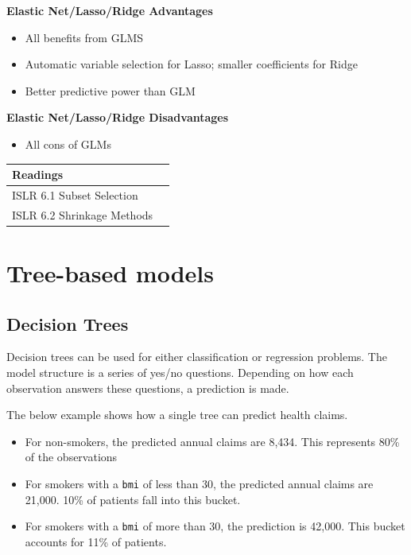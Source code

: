 \documentclass[]{book}
\providecommand{\tightlist}{%
  \setlength{\itemsep}{0pt}\setlength{\parskip}{0pt}}
\begin{document}
\textbf{Elastic Net/Lasso/Ridge Advantages}

\begin{itemize}
\tightlist
\item
  All benefits from GLMS
\item
  Automatic variable selection for Lasso; smaller coefficients for Ridge
\item
  Better predictive power than GLM
\end{itemize}

\textbf{Elastic Net/Lasso/Ridge Disadvantages}

\begin{itemize}
\tightlist
\item
  All cons of GLMs
\end{itemize}

\begin{longtable}[]{@{}ll@{}}
\toprule
Readings &\tabularnewline
\midrule
\endhead
ISLR 6.1 Subset Selection &\tabularnewline
ISLR 6.2 Shrinkage Methods &\tabularnewline
\bottomrule
\end{longtable}

\hypertarget{tree-based-models}{%
\chapter{Tree-based models}\label{tree-based-models}}

\hypertarget{decision-trees}{%
\section{Decision Trees}\label{decision-trees}}

Decision trees can be used for either classification or regression problems. The model structure is a series of yes/no questions. Depending on how each observation answers these questions, a prediction is made.

The below example shows how a single tree can predict health claims.

\begin{itemize}
\tightlist
\item
  For non-smokers, the predicted annual claims are 8,434. This represents 80\% of the observations
\item
  For smokers with a \texttt{bmi} of less than 30, the predicted annual claims are 21,000. 10\% of patients fall into this bucket.
\item
  For smokers with a \texttt{bmi} of more than 30, the prediction is 42,000. This bucket accounts for 11\% of patients.
\end{itemize}
\end{document}
